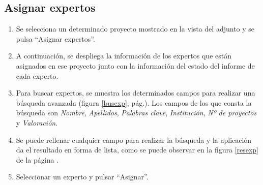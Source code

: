 \documentclass[11pt,a4paper,spanish,twoside]{book}
\begin{document}
\subsection{Asignar expertos}
\begin{enumerate}
\item Se selecciona un determinado proyecto mostrado en la vista del adjunto y
  se pulsa ``Asignar expertos''.
\item A continuación, se despliega la información de los expertos que están
  asignados en ese proyecto junto con la información del estado del informe de
  cada experto.
\item Para buscar expertos, se muestra los determinados campos para realizar una
  búsqueda avanzada (figura \ref{busexp}, pág.\pageref{busexp}). Los campos de
  los que consta la búsqueda son \emph{Nombre}, \emph{Apellidos},
  \emph{Palabras clave}, \emph{Institución}, \emph{Nº de proyectos} y
  \emph{Valoración}.  
\item Se puede rellenar cualquier campo para realizar la búsqueda y la
  aplicación da el resultado en forma de lista, como se puede observar en la
  figura \ref{resexp} de la página \pageref{resexp}.
\item Seleccionar un experto y pulsar ``Asignar''.
\end{enumerate}
\end{document}

